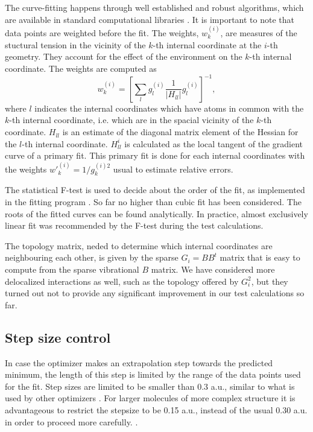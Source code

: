 \documentclass[prl,aps,twocolumn,showpacs,twocolumngrid,superbib]{revtex4}
\begin{document}
The curve-fitting happens through 
well established and robust algorithms, which are available in standard 
computational libraries \cite{slatec}. 
It is important to note
that data points are weighted before the fit. The weights, 
$w_{k}^{(i)}$, are
measures of the stuctural tension in the vicinity of the $k$-th internal
coordinate at the $i$-th geometry. They account for the effect of the 
environment on the $k$-th internal coordinate. 
The weights are computed as
\begin{equation}
w_{k}^{(i)} = \left[ \sum_{l} g_{l}^{(i)} \frac{1}{|H_{ll}^{}|} g_{l}^{(i)} \right]^{-1} ,
\end{equation}
where $l$ indicates the internal coordinates which have atoms in common
with the $k$-th internal coordinate, i.e. which are in the spacial 
vicinity of the $k$-th coordinate. 
$H_{ll}^{}$ is an estimate
of the diagonal matrix element of the Hessian for the $l$-th 
internal coordinate. $H_{ll}^{i}$ is calculated as the local tangent
of the gradient curve of a primary fit. 
This primary fit is done for each internal coordinates with 
the weights $w{'}_{k}^{(i)} = 1/g_{k}^{(i)2}$ usual to 
estimate relative errors.

The statistical F-test is used to decide about the order of the fit,
as implemented in the fitting program \cite{slatec}.
So far no higher than cubic fit has been considered. The roots
of the fitted curves can be found analytically. In practice,
almost exclusively linear fit was recommended by the F-test during
the test calculations.

The topology matrix, neded to determine which internal coordinates
are neighbouring each other, is given by 
the sparse $G_{i}=BB^{t}$ matrix that is easy to compute from the
sparse vibrational $B$ matrix. We have considered more delocalized 
interactions as well, such as the topology offered by $G_i^2$,
but they turned out not to provide any significant improvement in our
test calculations so far.

\subsection{Step size control}
In case the optimizer makes an extrapolation step towards the predicted
minimum, the length of this step is limited by the range of the
data points used for the fit. Step sizes are limited to be smaller
than 0.3 a.u., similar to what is used by other optimizers 
\cite{eckert}.
For larger molecules of more complex structure 
it is advantageous to restrict
the stepsize to be 0.15 a.u., instead of the usual 0.30 a.u. 
in order to proceed more carefully.
\cite{eckert}. 
\end{document}
